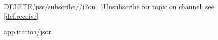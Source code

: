  
\begin{apiRoute}{DELETE}{/pss/subscribe//(?on=)}{Unsubscribe for topic on channel, see \ref{def:receive}}
{
}
{ }

\begin{routeParameter} 
\end{routeParameter}
\begin{queryParameter} 
\end{queryParameter} 
\begin{headerParameter} 
\end{headerParameter}
\begin{routeResponse}{application/json}
\end{routeResponse}
\end{apiRoute}

